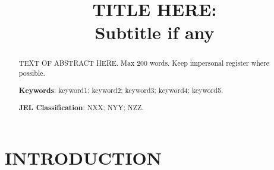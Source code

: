 \documentclass[12pt]{article}
\title{\Large TITLE HERE: \\Subtitle if any}
\author{}
\date{}
\begin{document}
\maketitle

\begin{abstract}
\noindent TEXT OF ABSTRACT HERE.
Max 200 words. Keep impersonal register where possible.

\vspace{.25cm}
\noindent \textbf{Keywords}: keyword1; keyword2; keyword3; keyword4; keyword5.

\vspace{.25cm}
\noindent \textbf{JEL Classification}: NXX; NYY; NZZ.
\end{abstract}

\newpage

\section{INTRODUCTION}


\clearpage
\printbibliography[title={FOOTNOTE REFERENCES (BIBLIOGRAPHY)}]
\end{document}
